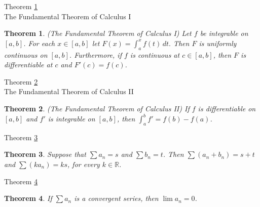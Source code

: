 \documentclass[avery5371,grid]{flashcards}
\newtheorem{theorem}{Theorem}
\newcommand{\bb}[1]{\mathbb{#1}}
\newcommand{\R}{\bb{R}}
\begin{document}
\begin{flashcard}[Theorem]{Theorem \ref{thm102}\\
The Fundamental Theorem of Calculus I}
\begin{theorem}
\label{thm102}
(The Fundamental Theorem of Calculus I)  Let $f$ be integrable on
$[a,b]$.  For each $x \in [a,b]$ let $\displaystyle F(x) =
\int _a ^x {f(t)}\, dt.$  Then $F$ is uniformly continuous on $[a,b]$. 
 Furthermore, if $f$ is continuous at $c \in [a,b]$, then $F$ is
differentiable at $c$ and $F'(c) = f(c)$.
\end{theorem}
\end{flashcard}

\begin{flashcard}[Theorem]{Theorem \ref{thm103}\\
The Fundamental Theorem of Calculus II}
\begin{theorem}
\label{thm103}
(The Fundamental Theorem of Calculus II)  If $f$ is differentiable on
$[a,b]$ and $f'$ is integrable on $[a,b]$, then
$\displaystyle \int _a ^b {f'} = f(b) - f(a)$.
\end{theorem}
\end{flashcard}

\begin{flashcard}[Theorem]{Theorem \ref{thm104}}
\begin{theorem}
\label{thm104}
Suppose that $\displaystyle \sum a_n = s$ and $\displaystyle
\sum b_n = t$.  Then $\displaystyle \sum (a_n + b_n) = s + t$ and
$\displaystyle \sum (ka_n) = ks$, for every $k \in \R$.
\end{theorem}
\end{flashcard}

\begin{flashcard}[Theorem]{Theorem \ref{thm105}}
\begin{theorem}
\label{thm105}
If $\displaystyle \sum a_n$ is a convergent series, then $\lim
a_n = 0$.
\end{theorem}
\end{flashcard}
\end{document}
